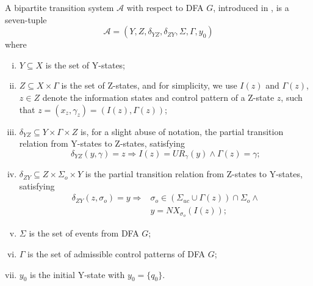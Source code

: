 \documentclass[journal,twoside,web]{ieeecolor}
\begin{document}
\begin{definition}
     A bipartite transition system $\mathcal{A}$ with respect to DFA $G$, introduced in \cite{yin2016synthesis}, is a seven-tuple
     $$
     \mathcal{A} = (Y, Z, \delta_{YZ}, \delta_{ZY}, \Sigma, \Gamma, y_0)
     $$
     where
     \begin{enumerate}[(i)]
         \item $Y \subseteq X$ is the set of Y-states;
         \item $Z \subseteq X \times \Gamma$ is the set of Z-states, and
         for simplicity, we use $I(z)$ and $\Gamma(z)$, $z \in Z$ denote the information states and control pattern of a Z-state $z$, such that $z = (x_z, \gamma_z) = (I(z), \Gamma(z))$;
         \item $\delta_{YZ} \subseteq Y \times \Gamma \times Z$ is, for a slight abuse of notation, the partial transition relation from Y-states to Z-states, satisfying
         \begin{equation}
             \delta_{YZ}(y, \gamma) = z \Rightarrow I(z) = UR_{\gamma}(y) \wedge \Gamma(z) = \gamma;
             \label{eq:bts_yz}
         \end{equation}
         \item $\delta_{ZY} \subseteq Z \times \Sigma_o \times Y$ is the partial transition relation from Z-states to Y-states, satisfying
         \begin{equation}
         \begin{aligned}
             \delta_{ZY}(z, \sigma_o) = y \Rightarrow 
             &\sigma_o \in (\Sigma_{uc} \cup \Gamma(z)) \cap \Sigma_o \wedge \\
             &y = NX_{\sigma_o}(I(z));
         \end{aligned}
              \label{eq:bts_zy}
         \end{equation}
        \item $\Sigma$ is the set of events from DFA $G$;
        \item $\Gamma$ is the set of admissible control patterns of DFA $G$;
        \item $y_0$ is the initial Y-state with $y_0 = \{ q_0 \}$.
     \end{enumerate}
    \label{def:bts}
\end{definition}
\end{document}
